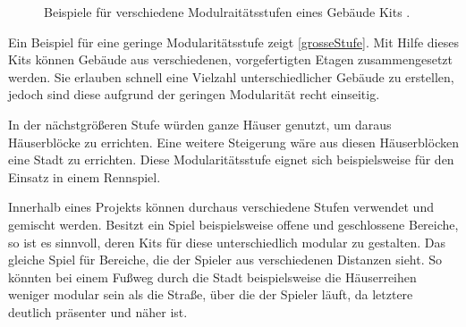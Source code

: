 \begin{figure}[!h]
\label{StufenBilder}
\centering
  \qquad
  \caption{Beispiele für verschiedene Modulraitätsstufen eines Gebäude Kits \parencite{Perry}.}%
\end{figure}
Ein Beispiel für eine geringe Modularitätsstufe zeigt \ref{grosseStufe}. Mit Hilfe dieses Kits können Gebäude aus verschiedenen, vorgefertigten Etagen zusammengesetzt werden. Sie erlauben schnell eine Vielzahl unterschiedlicher Gebäude zu erstellen, jedoch sind diese aufgrund der geringen Modularität recht einseitig.
\par
In der nächstgrößeren Stufe würden ganze Häuser genutzt, um daraus Häuserblöcke zu errichten. Eine weitere Steigerung wäre aus diesen Häuserblöcken eine Stadt zu errichten. Diese Modularitätsstufe eignet sich beispielsweise für den Einsatz in einem Rennspiel. \parencite{Perry}
\par
Innerhalb eines Projekts können durchaus verschiedene Stufen verwendet und gemischt werden. Besitzt ein Spiel beispielsweise offene und geschlossene Bereiche, so ist es sinnvoll, deren Kits für diese unterschiedlich modular zu gestalten. Das gleiche Spiel für Bereiche, die der Spieler aus verschiedenen Distanzen sieht. So könnten bei einem Fußweg durch die Stadt beispielsweise die Häuserreihen weniger modular sein als die Straße, über die der Spieler läuft, da letztere deutlich präsenter und näher ist. \parencite{Klafke}
